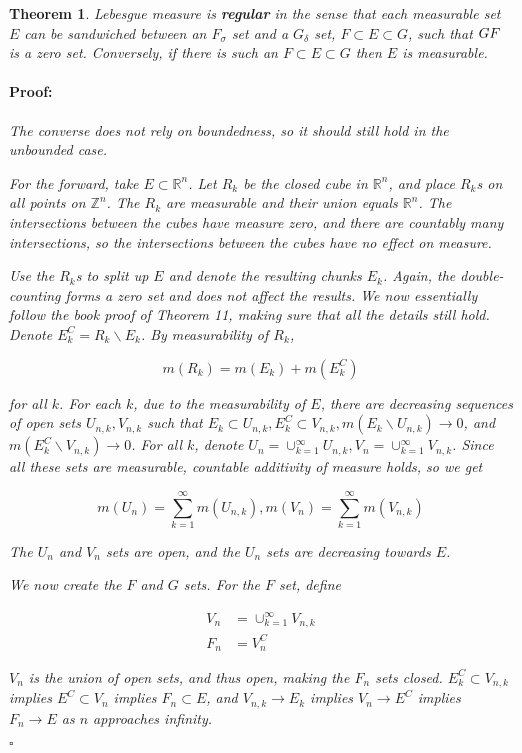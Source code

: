 \documentclass{article}
\newenvironment{proof}{\paragraph{Proof:}}{\hfill$\square$}
\newtheorem{theorem}{Theorem}
\newcommand{\R}{\mathbb{R}}
\newcommand{\Z}{\mathbb{Z}}
\begin{document}
\begin{theorem}
Lebesgue measure is \textbf{regular} in the sense that each measurable set $E$ can be sandwiched between an $F_\sigma$ set and a $G_\delta$ set, $F \subset E \subset G$, such that $G \\ F$ is a zero set. Conversely, if there is such an $F \subset E \subset G$ then $E$ is measurable.

\begin{proof}
The converse does not rely on boundedness, so it should still hold in the unbounded case.

For the forward, take $E \subset \R^n$. Let $R_k$ be the closed cube in $\R^n$, and place $R_k$s on all points on $\Z^n$. The $R_k$ are measurable and their union equals $\R^n$. The intersections between the cubes have measure zero, and there are countably many intersections, so the intersections between the cubes have no effect on measure.

Use the $R_k$s to split up $E$ and denote the resulting chunks $E_k$. Again, the double-counting forms a zero set and does not affect the results. We now essentially follow the book proof of Theorem 11, making sure that all the details still hold. Denote $E^C_k = R_k \backslash E_k$. By measurability of $R_k$,

\[
m(R_k) = m(E_k) + m(E^C_k)
\]

for all $k$. For each $k$, due to the measurability of $E$, there are decreasing sequences of open sets $U_{n, k}, V_{n, k}$ such that $E_k \subset U_{n, k}, E^C_k \subset V_{n, k}, m(E_k \backslash U_{n, k}) \rightarrow 0$, and $m(E^C_k \backslash V_{n, k}) \rightarrow 0$. For all $k$, denote $U_n = \cup_{k=1}^{\infty} U_{n, k}, V_n = \cup_{k=1}^{\infty} V_{n, k}$. Since all these sets are measurable, countable additivity of measure holds, so we get

\[
m(U_n) = \sum_{k=1}^\infty m(U_{n, k}), m(V_n) = \sum_{k=1}^\infty m(V_{n, k})
\]

The $U_n$ and $V_n$ sets are open, and the $U_n$ sets are decreasing towards $E$.

We now create the $F$ and $G$ sets. For the $F$ set, define

\begin{align*}
V_n &= \cup_{k=1}^\infty V_{n, k} \\
F_n &= V_n^C
\end{align*}

$V_n$ is the union of open sets, and thus open, making the $F_n$ sets closed. $E_k^C \subset V_{n, k}$ implies $E^C \subset V_n$ implies $F_n \subset E$, and $V_{n, k} \rightarrow E_k$ implies $V_n \rightarrow E^C$ implies $F_n \rightarrow E$ as $n$ approaches infinity.

\end{proof}
\end{theorem}
\end{document}

